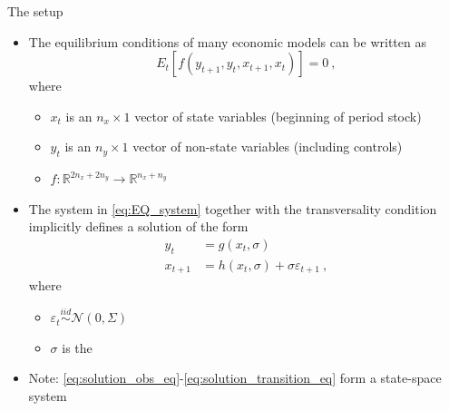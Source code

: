 \renewcommand{\Source}{\textcite{SGU2004}}
\begin{frame}{The setup}
  \begin{itemize}
    \item The equilibrium conditions of many economic models can be written as
          \begin{equation}
            {E_t}\left[ {f\left( {{y_{t + 1}},{y_{t}},{x_{t+1}},{x_t}} \right)} \right] = 0 \: , \label{eq:EQ_system}
          \end{equation}
          where
          \begin{itemize}
            \item $x_t$ is an $n_x \times 1$ vector of state variables (beginning of period stock)
            \item $y_t$ is an $n_y \times 1$ vector of non-state variables (including controls)
            \item $f:{\mathbb{R}^{2{n_x} + 2{n_y}}} \to {\mathbb{R}^{{n_x} + {n_y}}}$
          \end{itemize}
    \item The system in \eqref{eq:EQ_system} together with the transversality condition implicitly defines a solution of the form
          \begin{align}
            {y_t}       & = g\left( {{x_t},\sigma } \right) \label{eq:solution_obs_eq}                                             \\
            {x_{t + 1}} & = h\left( {{x_t},\sigma } \right) + \sigma {\varepsilon _{t + 1}} \label{eq:solution_transition_eq} \: ,
          \end{align}
          where
          \begin{itemize}
            \item $\varepsilon _{t}\overset{iid}{\sim}\mathcal{N}(0,\Sigma)$
            \item $\sigma $ is the 
          \end{itemize}
    \item Note: \eqref{eq:solution_obs_eq}-\eqref{eq:solution_transition_eq} form a state-space system
  \end{itemize}
\end{frame}



